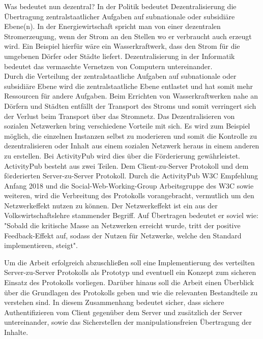 {	Was bedeutet nun dezentral? In der Politik bedeutet Dezentralisierung \glqq die Übertragung zentralstaatlicher Aufgaben auf subnationale oder subsidiäre Ebene(n)\grqq\cite{wikipedia-dezentralisierung-politik}. In der Energiewirtschaft spricht man von einer \glqq dezentralen Stromerzeugung\grqq, wenn der Strom an den Stellen wo er verbraucht auch erzeugt wird. Ein Beispiel hierfür wäre ein Wasserkraftwerk, dass den Strom für die umgebenen Dörfer oder Städte liefert\cite{wikipedia-dezentralisierung-energie}. Dezentralisierung in der Informatik bedeutet das vermaschte Vernetzen von Computern untereinander\cite{wikipedia-dezentralisierung-informatik}.\\
		
	Durch die Verteilung der zentralstaatliche Aufgaben auf subnationale oder subsidiäre Ebene wird die zentralstaatliche Ebene entlastet und hat somit mehr Ressourcen für andere Aufgaben. Beim Errichten von Wasserkraftwerken nahe an Dörfern und Städten entfällt der Transport des Stroms und somit verringert sich der Verlust beim Transport über das Stromnetz. Das Dezentralisieren von sozialen Netzwerken bring verschiedene Vorteile mit sich. Es wird zum Beispiel möglich, die einzelnen Instanzen selbst zu moderieren und somit die Kontrolle zu dezentralisieren oder Inhalt aus einem sozialen Netzwerk heraus in einem anderen zu erstellen. Bei ActivityPub wird dies über die Förderierung gewährleistet.\\
		
	ActivityPub besteht aus zwei Teilen. Dem Client-zu-Server Protokoll und dem förderierten Server-zu-Server Protokoll. Durch die ActivityPub W3C Empfehlung Anfang 2018 und die Social-Web-Working-Group Arbeitsgruppe des W3C sowie weiteren, wird die Verbreitung des Protokolls vorangebracht, vermutlich um den Netzwerkeffekt nutzen zu können. Der Netzwerkeffekt ist ein aus der Volkswirtschaftslehre stammender Begriff. Auf Übertragen bedeutet er soviel wie: "Sobald die kritische Masse an Netzwerken erreicht wurde, tritt der positive Feedback-Effekt auf, sodass der Nutzen für Netzwerke, welche den Standard implementieren, steigt".\\
		
	Um die Arbeit erfolgreich abzuschließen soll eine Implementierung des verteilten Server-zu-Server Protokolls als Prototyp und eventuell ein Konzept zum sicheren Einsatz des Protokolls vorliegen. Darüber hinaus soll die Arbeit einen Überblick über die Grundlagen des Protokolls geben und wie die relevanten Bestandteile zu verstehen sind. In diesem Zusammenhang bedeutet \glqq sicher\grqq, dass sichere Authentifizieren vom Client gegenüber dem Server und zusätzlich der Server untereinander, sowie das Sicherstellen der manipulationsfreien Übertragung der Inhalte.
	
}
